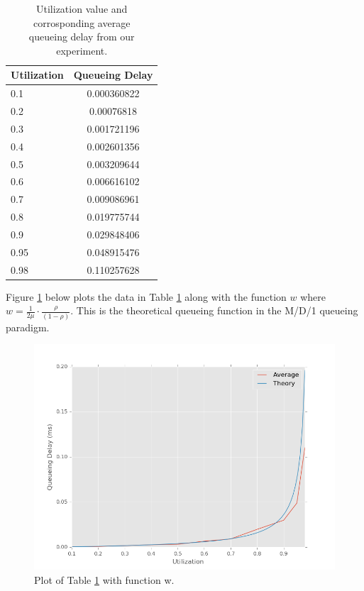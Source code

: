\documentclass[11pt]{article}
\begin{document}
\begin{table}[H]
\begin{center}
\caption{Utilization value and corrosponding average\\queueing delay from our experiment.}
\label{tbl3}
\begin{tabular}{lc}
  \toprule
  Utilization & Queueing Delay\\
  \midrule
  0.1 & 0.000360822\\
  0.2 & 0.00076818\\
  0.3 & 0.001721196\\
  0.4 & 0.002601356\\
  0.5 & 0.003209644\\
  0.6 & 0.006616102\\
  0.7 & 0.009086961\\
  0.8 & 0.019775744\\
  0.9 & 0.029848406\\
  0.95 & 0.048915476\\
  0.98 & 0.110257628\\
  \bottomrule
\end{tabular}
\end{center}
\end{table}

Figure \ref{exp3fig} below plots the data in Table \ref{tbl3} along with the function $w$ where $w = \frac{1}{2\mu}\cdot\frac{\rho}{(1-\rho)}$. This is the theoretical queueing function in the M/D/1 queueing paradigm.

\begin{figure}[H]
\caption{Plot of Table \ref{tbl3} with function w.}
\label{exp3fig}
  \centering
  \includegraphics[width=15cm]{queing}
\end{figure}
\end{document}
